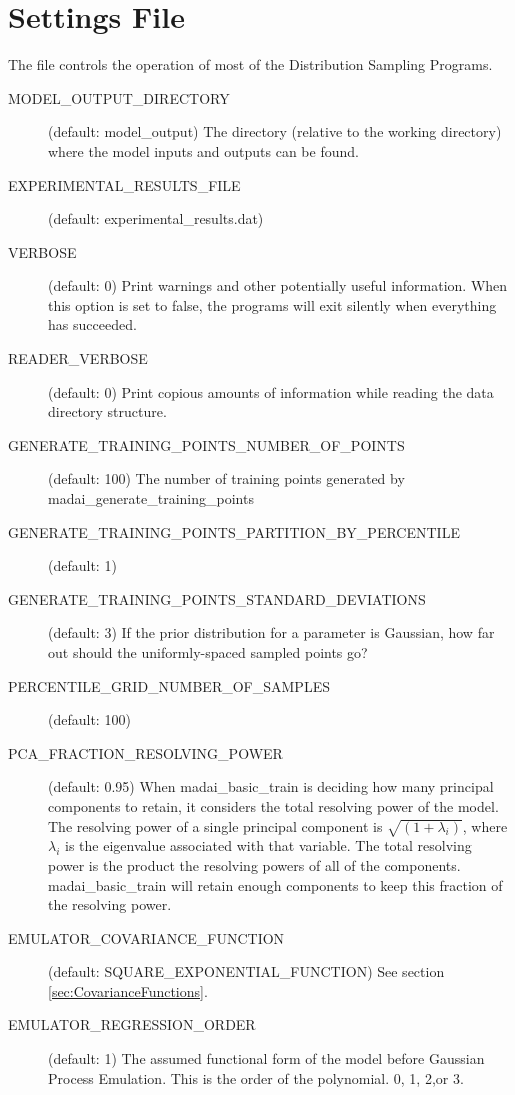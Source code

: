 
\section{Settings File}\label{sec:settings}

The file  controls the operation of most of the
Distribution Sampling Programs.

\begin{description}
    \item[MODEL\_OUTPUT\_DIRECTORY] (default: model\_output) The directory (relative to the working directory) where the model inputs and outputs can be found.
    \item[EXPERIMENTAL\_RESULTS\_FILE] (default: experimental\_results.dat)
    \item[VERBOSE] (default: 0) Print warnings and other potentially useful information. When this option is set to false, the programs will exit silently when everything has succeeded.
    \item[READER\_VERBOSE] (default: 0) Print copious amounts of information while reading the data directory structure.
    \item[GENERATE\_TRAINING\_POINTS\_NUMBER\_OF\_POINTS] (default: 100) The number of training points generated by madai\_generate\_training\_points
    \item[GENERATE\_TRAINING\_POINTS\_PARTITION\_BY\_PERCENTILE] (default: 1)
    \item[GENERATE\_TRAINING\_POINTS\_STANDARD\_DEVIATIONS] (default: 3) If the prior distribution for a parameter is Gaussian, how far out should the uniformly-spaced sampled points go?
    \item[PERCENTILE\_GRID\_NUMBER\_OF\_SAMPLES] (default: 100)
    \item[PCA\_FRACTION\_RESOLVING\_POWER] (default: 0.95)  When madai\_basic\_train is deciding how many principal components to retain, it considers the total resolving power of the model. The resolving power of a single principal component is $\sqrt{(1 + \lambda_i)}$, where $\lambda_i$ is the eigenvalue associated with that variable. The total resolving power is the product the resolving powers of all of the components. madai\_basic\_train will retain enough components to keep this fraction of the resolving power.
    \item[EMULATOR\_COVARIANCE\_FUNCTION] (default: SQUARE\_EXPONENTIAL\_FUNCTION) See section \ref{sec:CovarianceFunctions}.
    \item[EMULATOR\_REGRESSION\_ORDER] (default: 1) The assumed functional form of the model before Gaussian Process Emulation. This is the order of the polynomial. 0, 1, 2,or 3.

\end{description}
